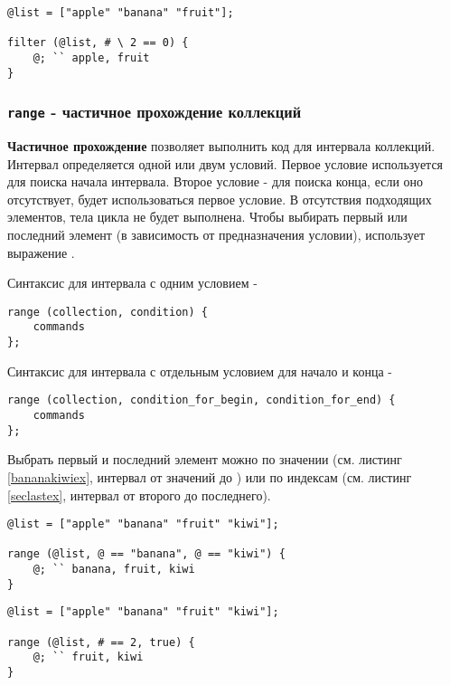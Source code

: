 \documentclass[a4paper, 14pt]{extarticle}
\begin{document}
\begin{lstlisting}[caption=Фильтрование по индексов, label=filterindexex]
@list = ["apple" "banana" "fruit"];

filter (@list, # \ 2 == 0) {
	@; `` apple, fruit
}
\end{lstlisting}

\subsubsection{\lstinline`range` - частичное прохождение коллекций}

{\bf Частичное прохождение} позволяет выполнить код для интервала коллекций. Интервал определяется одной или двум условий. Первое условие используется для поиска начала интервала. Второе условие - для поиска конца, если оно отсутствует, будет использоваться первое условие. В отсутствия подходящих элементов, тела цикла не будет выполнена. Чтобы выбирать первый или последний элемент (в зависимость от предназначения условии), использует выражение \true{}.

Синтаксис для интервала с одним условием -
\begin{lstlisting}[numbers=none]
range (collection, condition) {
	commands
};
\end{lstlisting}

Синтаксис для интервала с отдельным условием для начало и конца -
\begin{lstlisting}[numbers=none]
range (collection, condition_for_begin, condition_for_end) {
	commands
};
\end{lstlisting}

Выбрать первый и последний элемент можно по значении (см. листинг \ref{bananakiwiex}, интервал от значений  до ) или по индексам (см. листинг \ref{seclastex}, интервал от второго до последнего).

\begin{lstlisting}[caption=Интервал: от banana до kiwi, label=bananakiwiex]
@list = ["apple" "banana" "fruit" "kiwi"];

range (@list, @ == "banana", @ == "kiwi") {
	@; `` banana, fruit, kiwi
}
\end{lstlisting}

\begin{lstlisting}[caption=Интервал: от второго до последнего, label=seclastex]
@list = ["apple" "banana" "fruit" "kiwi"];

range (@list, # == 2, true) {
	@; `` fruit, kiwi
}
\end{lstlisting}
\end{document}
